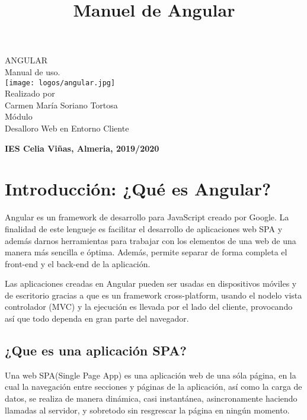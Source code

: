 \documentclass[openany]{book}
\title{Manuel de Angular}
\begin{document}
 \begin{titlepage}

 \begin{center}\bf\sffamily
  
  \vspace*{10\baselineskip}
  {\Huge ANGULAR }\\
  \doublespacing
  {\LARGE Manual de uso.}\\
  \centering
  \texttt{[image: logos/angular.jpg]}	\\
  {\large Realizado por}\\
  {\large Carmen María Soriano Tortosa}\\
  [1cm]
  {\large Módulo}\\
  {\large Desalloro Web en Entorno Cliente}  \\ 
\end{center}
\vfill
 \begin{flushright}
  {\bf\sffamily\large IES Celia Viñas, Almeria, 2019/2020 {\large }}
 \end{flushright}

\end{titlepage}

\tableofcontents %
\cleardoublepage


\chapter{Introducción: ¿Qué es Angular?}

Angular es un framework de desarrollo para JavaScript creado por Google. La finalidad de este lengueje es facilitar el desarrollo de aplicaciones web SPA y además darnos herramientas para trabajar con los elementos de una web de una manera más sencilla e óptima. Además, permite separar de forma completa el front-end y el back-end de la aplicación. 

Las aplicaciones creadas en Angular pueden ser usadas en dispositivos móviles y de escritorio gracias a que es un framework cross-platform, usando el nodelo vista controlador (MVC) y la ejecución es llevada por el lado del cliente, provocando así que todo dependa en gran parte del navegador.  

\section{¿Que es una aplicación SPA?}
Una web SPA(Single Page App) es una aplicación web de una sóla página, en la cual la navegación entre secciones y páginas de la aplicación, así como la carga de datos, se realiza de manera dinámica, casi instantánea, asincronamente haciendo llamadas al servidor, y sobretodo sin resgrescar la página en ningún momento. 
\end{document}
